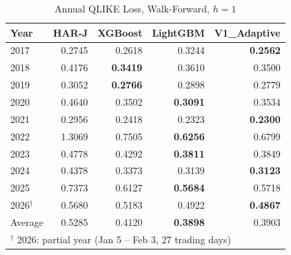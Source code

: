 \begin{table}[htbp]
\centering
\caption{Annual QLIKE Loss, Walk-Forward, $h=1$}
\label{tab:qlike_wf_h1}
\begin{tabular}{lrrrr}
\toprule
Year & HAR-J & XGBoost & LightGBM & V1\_Adaptive \\
\midrule
2017 & 0.2745 & 0.2618 & 0.3244 & \textbf{0.2562} \\
2018 & 0.4176 & \textbf{0.3419} & 0.3610 & 0.3500 \\
2019 & 0.3052 & \textbf{0.2766} & 0.2898 & 0.2779 \\
2020 & 0.4640 & 0.3502 & \textbf{0.3091} & 0.3534 \\
2021 & 0.2956 & 0.2418 & 0.2323 & \textbf{0.2300} \\
2022 & 1.3069 & 0.7505 & \textbf{0.6256} & 0.6799 \\
2023 & 0.4778 & 0.4292 & \textbf{0.3811} & 0.3849 \\
2024 & 0.4378 & 0.3373 & 0.3139 & \textbf{0.3123} \\
2025 & 0.7373 & 0.6127 & \textbf{0.5684} & 0.5718 \\
2026$^{\dagger}$ & 0.5680 & 0.5183 & 0.4922 & \textbf{0.4867} \\
\midrule
Average & 0.5285 & 0.4120 & \textbf{0.3898} & 0.3903 \\
\bottomrule
\multicolumn{5}{l}{\footnotesize $^\dagger$ 2026: partial year (Jan 5 -- Feb 3, 27 trading days)} \\
\end{tabular}
\end{table}